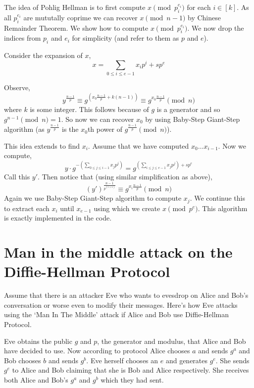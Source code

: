 \documentclass[letterpaper,12pt]{article}
\theoremstyle{remark}
\begin{document}
The idea of Pohlig Hellman is to first compute $x \pmod {p_i^{e_i}}$ for each $i \in [k]$. As all $p_i^{e_i}$ are mututally coprime we can recover $x \pmod {n-1}$ by Chinese Remainder Theorem. We show how to compute $x \pmod {p_i^{e_i}}$. We now drop the indices from $p_i$ and $e_i$ for simplicity (and refer to them as $p$ and $e$).

Consider the expansion of $x$,
\begin{equation*}
    x = \sum_{0 \le i \le e-1} x_i p^i + sp^e
\end{equation*}

Observe,
\begin{equation*}
    y^{\frac{n-1}{p}} \equiv g^{\left(x_0 \frac{n-1}{p} + k(n-1)\right)} \equiv g^{x_0 \frac{n-1}{p}} \pmod n 
\end{equation*}
where $k$ is some integer.
This follows because of $g$ is a generator and so $g^{n-1} \pmod n = 1$. So now we can recover $x_0$ by using Baby-Step Giant-Step algorithm (as $y^{\frac{n-1}{p}}$ is the $x_0$th power of $g^{\frac{n-1}{p}} \pmod n$). 

This idea extends to find $x_i$. Assume that we have computed $x_0 \dots x_{i-1}$. Now we compute, 
\begin{equation*}
    y\cdot g^{-(\sum_{0\le j \le i-1} x_j p^j)} = g^{(\sum_{i \le j \le e-1} x_j p^j) + sp^e}
\end{equation*}
Call this $y'$. Then notice that (using similar simplification as above),
\begin{equation*}
    (y')^{\frac{n-1}{p^{(i+1)}}} \equiv g^{x_i \frac{n-1}{p}} \pmod n 
\end{equation*}
Again we use Baby-Step Giant-Step algorithm to compute $x_j$. We continue this to extract each $x_i$ until $x_{e-1}$ using which we create $x \pmod {p^e}$. This algorithm is exactly implemented in the code.

\section{Man in the middle attack on the Diffie-Hellman Protocol}

Assume that there is an attacker Eve who wants to evesdrop on Alice and Bob's conversation or worse even to modify their messages. Here's how Eve attacks using the `Man In The Middle' attack if Alice and Bob use Diffie-Hellman Protocol.

Eve obtains the public $g$ and $p$, the generator and modulus, that Alice and Bob have decided to use. Now according to protocol Alice chooses $a$ and sends $g^a$ and Bob chooses $b$ and sends $g^b$. Eve herself chooses an $e$ and generates $g^e$. She sends $g^e$ to Alice and Bob claiming that she is Bob and Alice respectively. She receives both Alice and Bob's $g^a$ and $g^b$ which they had sent. 
\end{document}
